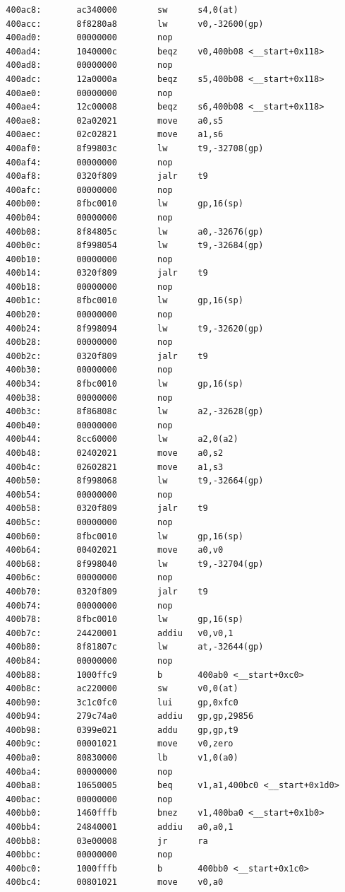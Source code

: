 \documentclass[11pt]{article}
\begin{document}
\begin{verbatim}
  400ac8:       ac340000        sw      s4,0(at)
  400acc:       8f8280a8        lw      v0,-32600(gp)
  400ad0:       00000000        nop
  400ad4:       1040000c        beqz    v0,400b08 <__start+0x118>
  400ad8:       00000000        nop
  400adc:       12a0000a        beqz    s5,400b08 <__start+0x118>
  400ae0:       00000000        nop
  400ae4:       12c00008        beqz    s6,400b08 <__start+0x118>
  400ae8:       02a02021        move    a0,s5
  400aec:       02c02821        move    a1,s6
  400af0:       8f99803c        lw      t9,-32708(gp)
  400af4:       00000000        nop
  400af8:       0320f809        jalr    t9
  400afc:       00000000        nop
  400b00:       8fbc0010        lw      gp,16(sp)
  400b04:       00000000        nop
  400b08:       8f84805c        lw      a0,-32676(gp)
  400b0c:       8f998054        lw      t9,-32684(gp)
  400b10:       00000000        nop
  400b14:       0320f809        jalr    t9
  400b18:       00000000        nop
  400b1c:       8fbc0010        lw      gp,16(sp)
  400b20:       00000000        nop
  400b24:       8f998094        lw      t9,-32620(gp)
  400b28:       00000000        nop
  400b2c:       0320f809        jalr    t9
  400b30:       00000000        nop
  400b34:       8fbc0010        lw      gp,16(sp)
  400b38:       00000000        nop
  400b3c:       8f86808c        lw      a2,-32628(gp)
  400b40:       00000000        nop
  400b44:       8cc60000        lw      a2,0(a2)
  400b48:       02402021        move    a0,s2
  400b4c:       02602821        move    a1,s3
  400b50:       8f998068        lw      t9,-32664(gp)
  400b54:       00000000        nop
  400b58:       0320f809        jalr    t9
  400b5c:       00000000        nop
  400b60:       8fbc0010        lw      gp,16(sp)
  400b64:       00402021        move    a0,v0
  400b68:       8f998040        lw      t9,-32704(gp)
  400b6c:       00000000        nop
  400b70:       0320f809        jalr    t9
  400b74:       00000000        nop
  400b78:       8fbc0010        lw      gp,16(sp)
  400b7c:       24420001        addiu   v0,v0,1
  400b80:       8f81807c        lw      at,-32644(gp)
  400b84:       00000000        nop
  400b88:       1000ffc9        b       400ab0 <__start+0xc0>
  400b8c:       ac220000        sw      v0,0(at)
  400b90:       3c1c0fc0        lui     gp,0xfc0
  400b94:       279c74a0        addiu   gp,gp,29856
  400b98:       0399e021        addu    gp,gp,t9
  400b9c:       00001021        move    v0,zero
  400ba0:       80830000        lb      v1,0(a0)
  400ba4:       00000000        nop
  400ba8:       10650005        beq     v1,a1,400bc0 <__start+0x1d0>
  400bac:       00000000        nop
  400bb0:       1460fffb        bnez    v1,400ba0 <__start+0x1b0>
  400bb4:       24840001        addiu   a0,a0,1
  400bb8:       03e00008        jr      ra
  400bbc:       00000000        nop
  400bc0:       1000fffb        b       400bb0 <__start+0x1c0>
  400bc4:       00801021        move    v0,a0


\end{verbatim}
\end{document}
